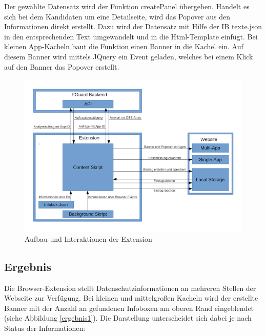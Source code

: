 Der gewählte Datensatz wird der Funktion \glqq createPanel\grqq{} übergeben. Handelt es sich bei dem Kandidaten um eine Detailseite, wird das Popover aus den Informationen direkt erstellt. Dazu wird der Datensatz mit Hilfe der IB texte.json in den entsprechenden Text umgewandelt und in die Html-Template einfügt.
Bei kleinen App-Kacheln baut die Funktion einen Banner in die Kachel ein. Auf diesem Banner wird mittels JQuery ein Event geladen, welches bei einem Klick auf den Banner das Popover erstellt.





\begin{figure}[ht]
	\centering
	\includegraphics[width=1\textwidth]{pics/Aufbau.png}
	\caption{Aufbau und Interaktionen der Extension}
	\label{aufbau}
\end{figure}


\subsection{Ergebnis}
\label{ss:ergebnisseht1}

Die Browser-Extension stellt Datenschutzinformationen an mehreren Stellen der Webseite zur Verfügung. Bei kleinen und mittelgroßen Kacheln wird der erstellte Banner mit der Anzahl an gefundenen Infoboxen am oberen Rand eingeblendet (siehe Abbildung \ref{ergebnis1}). Die Darstellung unterscheidet sich dabei je nach Status der Informationen:

